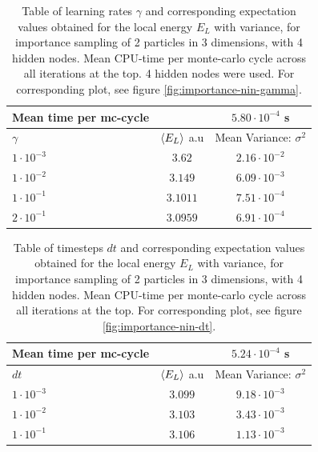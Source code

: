 \begin{table}[h]
\begin{tabular}{l c c}
	Mean time per mc-cycle & &$5.80\cdot10^{-4}$ s \\
	\hline
	$\gamma$ & $\langle E_L \rangle$ a.u & Mean Variance: $\sigma^2$\\
	\hline
	$1\cdot10^{-3}$ & $3.62$ & $2.16\cdot10^{-2}$ \\
	$1\cdot10^{-2}$ & $3.149$ & $6.09\cdot10^{-3}$ \\
	$1\cdot10^{-1}$ & $3.1011$ & $7.51\cdot10^{-4}$ \\
	$2\cdot10^{-1}$ & $3.0959$ & $6.91\cdot10^{-4}$ \\
\end{tabular}
\caption{Table of learning rates $\gamma$ and corresponding expectation values obtained for the local energy $E_L$ with variance, for importance sampling
		of 2 particles in 3 dimensions, with 4 hidden nodes.
		Mean CPU-time per monte-carlo cycle across all iterations at the top. 4 hidden nodes were used.
	For corresponding plot, see figure \ref{fig:importance-nin-gamma}.}
\label{tab:importance-nin-gamma}
\end{table}

\begin{table}[h]
\begin{tabular}{l c c}
	Mean time per mc-cycle & & $5.24\cdot10^{-4}$ s \\
	\hline
	$dt$ & $\langle E_L \rangle$ a.u & Mean Variance: $\sigma^2$\\
	\hline
	$1\cdot10^{-3}$ & $3.099$ & $9.18\cdot10^{-3}$ \\
	$1\cdot10^{-2}$ & $3.103$ & $3.43\cdot10^{-3}$ \\
	$1\cdot10^{-1}$ & $3.106$ & $1.13\cdot10^{-3}$ \\
\end{tabular}
\caption{Table of timesteps $dt$ and corresponding expectation values obtained for the local energy $E_L$ with variance, for importance sampling
		of 2 particles in 3 dimensions, with 4 hidden nodes.
		Mean CPU-time per monte-carlo cycle across all iterations at the top.
	For corresponding plot, see figure \ref{fig:importance-nin-dt}.}
\label{tab:importance-nin-dt}
\end{table}

